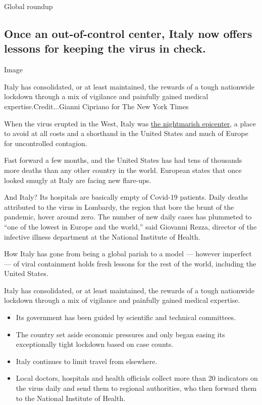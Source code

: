 Global roundup

\hypertarget{once-an-out-of-control-center-italy-now-offers-lessons-for-keeping-the-virus-in-check}{%
\subsection{Once an out-of-control center, Italy now offers lessons for
keeping the virus in
check.}\label{once-an-out-of-control-center-italy-now-offers-lessons-for-keeping-the-virus-in-check}}

Image

Italy has consolidated, or at least maintained, the rewards of a tough
nationwide lockdown through a mix of vigilance and painfully gained
medical expertise.Credit...Gianni Cipriano for The New York Times

When the virus erupted in the West, Italy was
\href{https://www.nytimes3xbfgragh.onion/interactive/2020/03/27/world/europe/coronavirus-italy-bergamo.html}{the
nightmarish epicenter}, a place to avoid at all costs and a shorthand in
the United States and much of Europe for uncontrolled contagion.

Fast forward a few months, and the United States has had tens of
thousands more deaths than any other country in the world. European
states that once looked smugly at Italy are facing new flare-ups.

And Italy? Its hospitals are basically empty of Covid-19 patients. Daily
deaths attributed to the virus in Lombardy, the region that bore the
brunt of the pandemic, hover around zero. The number of new daily cases
has plummeted to ``one of the lowest in Europe and the world,'' said
Giovanni Rezza, director of the infective illness department at the
National Institute of Health.

How Italy has gone from being a global pariah to a model --- however
imperfect --- of viral containment holds fresh lessons for the rest of
the world, including the United States.

Italy has consolidated, or at least maintained, the rewards of a tough
nationwide lockdown through a mix of vigilance and painfully gained
medical expertise.

\begin{itemize}
\item
  Its government has been guided by scientific and technical committees.
\item
  The country set aside economic pressures and only began easing its
  exceptionally tight lockdown based on case counts.
\item
  Italy continues to limit travel from elsewhere.
\item
  Local doctors, hospitals and health officials collect more than 20
  indicators on the virus daily and send them to regional authorities,
  who then forward them to the National Institute of Health.
\end{itemize}

